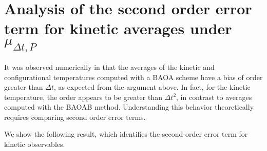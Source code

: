\section{Analysis of the second order error term for kinetic averages under $\mu_{\Delta t,P}$}\label{BAOA kinetic second order estimate}
It was observed numerically in \cite{KK22} that the averages of the kinetic and configurational temperatures computed with a BAOA scheme have a bias of order greater than $\Delta t$, as expected from the argument above.
In fact, for the kinetic temperature, the order appears to  be greater than $\Delta t^2$, in contrast to averages computed with the BAOAB method.
Understanding this behavior theoretically requires comparing second order error terms.

We show the following result, which identifies the second-order error term for kinetic observables.

